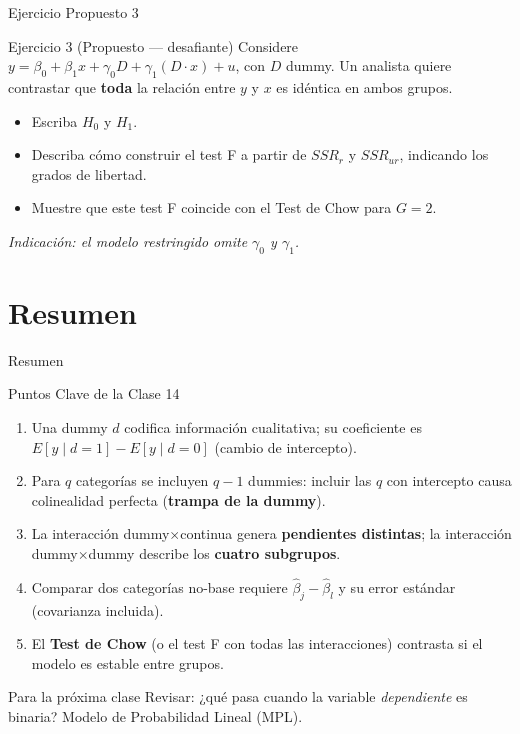 \documentclass{beamer}
\begin{document}
\begin{frame}{Ejercicio Propuesto 3}
\begin{block}{Ejercicio 3 (Propuesto — desafiante)}
Considere $y=\beta_0+\beta_1 x+\gamma_0 D+\gamma_1 (D\cdot x)+u$, con $D$ dummy. Un analista quiere contrastar que \textbf{toda} la relación entre $y$ y $x$ es idéntica en ambos grupos.
\begin{itemize}
    \item Escriba $H_0$ y $H_1$.
    \item Describa cómo construir el test F a partir de $SSR_r$ y $SSR_{ur}$, indicando los grados de libertad.
    \item Muestre que este test F coincide con el Test de Chow para $G=2$.
\end{itemize}
\end{block}
{\small \textit{Indicación: el modelo restringido omite $\gamma_0$ y $\gamma_1$.}}
\end{frame}

\section{Resumen}

\begin{frame}{Resumen}

\begin{block}{Puntos Clave de la Clase 14}
\begin{enumerate}
    \item Una dummy $d$ codifica información cualitativa; su coeficiente es $E[y\mid d=1]-E[y\mid d=0]$ (cambio de intercepto).
    \item Para $q$ categorías se incluyen $q-1$ dummies: incluir las $q$ con intercepto causa colinealidad perfecta (\textbf{trampa de la dummy}).
    \item La interacción dummy$\times$continua genera \textbf{pendientes distintas}; la interacción dummy$\times$dummy describe los \textbf{cuatro subgrupos}.
    \item Comparar dos categorías no-base requiere $\hat\beta_j-\hat\beta_l$ y su error estándar (covarianza incluida).
    \item El \textbf{Test de Chow} (o el test F con todas las interacciones) contrasta si el modelo es estable entre grupos.
\end{enumerate}
\end{block}

\begin{alertblock}{Para la próxima clase}
Revisar: ¿qué pasa cuando la variable \emph{dependiente} es binaria? Modelo de Probabilidad Lineal (MPL).
\end{alertblock}

\end{frame}
\end{document}
